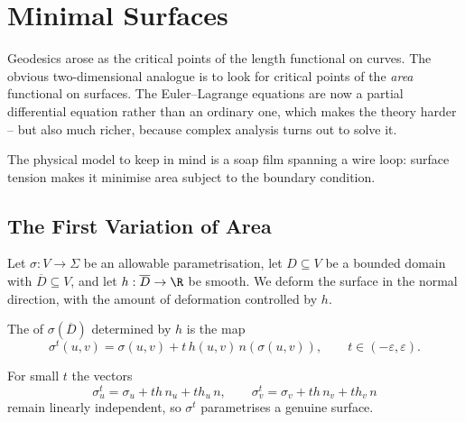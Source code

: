 \section{Minimal Surfaces}

Geodesics arose as the critical points of the length functional on curves. The obvious two-dimensional analogue is to look for critical points of the \emph{area} functional on surfaces. The Euler--Lagrange equations are now a partial differential equation rather than an ordinary one, which makes the theory harder -- but also much richer, because complex analysis turns out to solve it.

The physical model to keep in mind is a soap film spanning a wire loop: surface tension makes it minimise area subject to the boundary condition.

\subsection{The First Variation of Area}

Let $\sigma: V \rightarrow \Sigma$ be an allowable parametrisation, let $D \subseteq V$ be a bounded domain with $\overline D \subseteq V$, and let $h: \overline D \rightarrow \R$ be smooth. We deform the surface in the normal direction, with the amount of deformation controlled by $h$.

\begin{definition}
    The  of $\sigma(\overline D)$ determined by $h$ is the map
    $$
    \sigma^t(u,v) = \sigma(u,v) + t\,h(u,v)\,n(\sigma(u,v)), \qquad t \in (-\varepsilon,\varepsilon).
    $$
\end{definition}

For small $t$ the vectors
$$
\sigma^t_u = \sigma_u + th\,n_u + th_u\, n, \qquad \sigma^t_v = \sigma_v + th\,n_v + th_v\,n
$$
remain linearly independent, so $\sigma^t$ parametrises a genuine surface.

